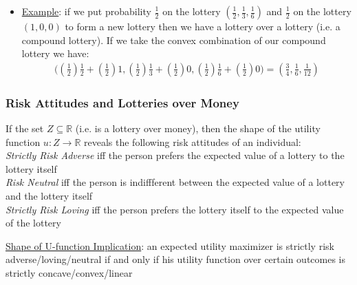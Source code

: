 \documentclass{article}
\begin{document}
  \begin{itemize}
    \item  \underline{Example}: if we put probability $\tfrac{1}{2}$ on the lottery $(\tfrac{1}{2}, \tfrac{1}{3}, \tfrac{1}{6})$ and $\tfrac{1}{2}$ on the lottery $(1,0,0)$ to form a new lottery then we have a lottery over a lottery (i.e. a compound lottery). If we take the convex combination of our compound lottery we have:
    \begin{gather*}
      \bigg((\frac{1}{2})\frac{1}{2} + (\frac{1}{2})1, (\frac{1}{2})\frac{1}{3} + (\frac{1}{2})0, (\frac{1}{2})\frac{1}{6} + (\frac{1}{2})0 \bigg) = (\frac{3}{4}, \frac{1}{6}, \frac{1}{12})
    \end{gather*}
  \end{itemize}
  \par
\vspace{6mm}
\subsubsection{Risk Attitudes and Lotteries over Money}
If the set $Z \subseteq \mathbb{R}$ (i.e. is a lottery over money), then the shape of the utility function $u: Z \rightarrow \mathbb{R}$ reveals the following risk attitudes of an individual: \\
\null\quad \textit{Strictly Risk Adverse} iff the person prefers the expected value of a lottery to the lottery itself \\
\null\quad \textit{Risk Neutral} iff the person is indiffferent between the expected value of a lottery and the lottery itself \\
\null\quad \textit{Strictly Risk Loving} iff the person prefers the lottery itself to the expected value of the lottery \par \vspace{0.3em}
  \underline{Shape of U-function Implication}: an expected utility maximizer is strictly risk adverse/loving/neutral if and only if his utility function over certain outcomes is strictly concave/convex/linear
\vspace{6mm}
\end{document}
